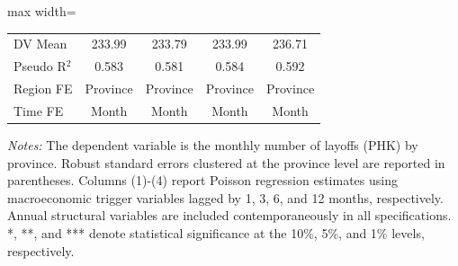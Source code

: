 \begin{table}[H]
\begin{adjustbox}{max width=\textwidth}
\begin{tabular}{l*{4}{c}}
DV Mean     &      233.99         &      233.79         &      233.99         &      236.71         \\
Pseudo R$^2$&       0.583         &       0.581         &       0.584         &       0.592         \\
Region FE   &    Province         &    Province         &    Province         &    Province         \\
Time FE     &       Month         &       Month         &       Month         &       Month         \\
\bottomrule
\end{tabular}
\end{adjustbox}
\begin{tablenotes}
\footnotesize
\item \textit{Notes:} The dependent variable is the monthly number of layoffs (PHK) by province. Robust standard errors clustered at the province level are reported in parentheses. Columns (1)-(4) report Poisson regression estimates using macroeconomic trigger variables lagged by 1, 3, 6, and 12 months, respectively. Annual structural variables are included contemporaneously in all specifications. *, **, and *** denote statistical significance at the 10\%, 5\%, and 1\% levels, respectively.
\end{tablenotes}
\end{table}
